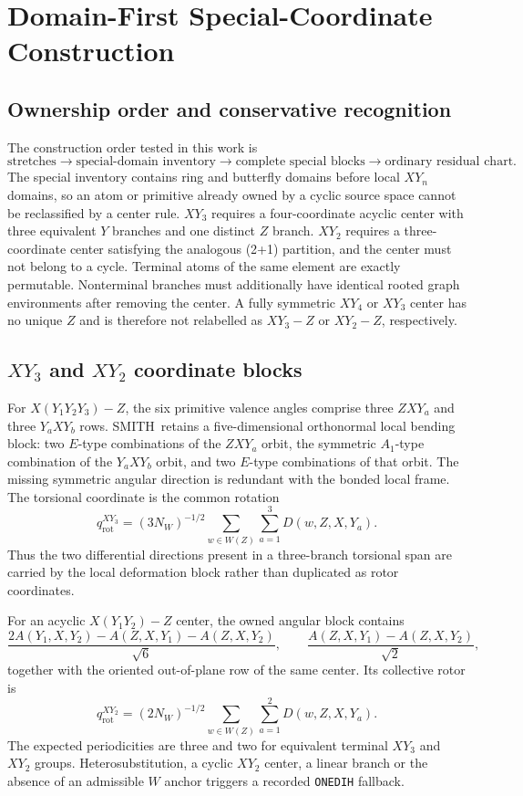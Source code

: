 \documentclass[10pt]{article}
\newcommand{\SMITH}{\textsc{SMITH}}
\begin{document}
{\color{red}
\section{Domain-First Special-Coordinate Construction}

\subsection{Ownership order and conservative recognition}

The construction order tested in this work is
\[
\text{stretches}\longrightarrow\text{special-domain inventory}
\longrightarrow\text{complete special blocks}
\longrightarrow\text{ordinary residual chart}.
\]
The special inventory contains ring and butterfly domains before local
\(XY_n\) domains, so an atom or primitive already owned by a cyclic source
space cannot be reclassified by a center rule.  \(XY_3\) requires a
four-coordinate acyclic center with three equivalent \(Y\) branches and one
distinct \(Z\) branch.  \(XY_2\) requires a three-coordinate center satisfying
the analogous (2+1) partition, and the center must not belong to a cycle.
Terminal atoms of the same element are exactly permutable.  Nonterminal
branches must additionally have identical rooted graph environments after
removing the center.  A fully symmetric \(XY_4\) or \(XY_3\) center has no
unique \(Z\) and is therefore not relabelled as \(XY_3-Z\) or \(XY_2-Z\),
respectively.

\subsection{\texorpdfstring{\(XY_3\) and \(XY_2\)}{XY3 and XY2} coordinate blocks}

For \(X(Y_1Y_2Y_3)-Z\), the six primitive valence angles comprise three
\(ZXY_a\) and three \(Y_aXY_b\) rows.  \SMITH\ retains a five-dimensional
orthonormal local bending block: two \(E\)-type combinations of the
\(ZXY_a\) orbit, the symmetric \(A_1\)-type combination of the
\(Y_aXY_b\) orbit, and two \(E\)-type combinations of that orbit.  The
missing symmetric angular direction is redundant with the bonded local frame.
The torsional coordinate is the common rotation
\[
q_{\mathrm{rot}}^{XY_3}=(3N_W)^{-1/2}
\sum_{w\in W(Z)}\sum_{a=1}^{3}D(w,Z,X,Y_a).
\]
Thus the two differential directions present in a three-branch torsional span
are carried by the local deformation block rather than duplicated as rotor
coordinates.

For an acyclic \(X(Y_1Y_2)-Z\) center, the owned angular block contains
\[
\frac{2A(Y_1,X,Y_2)-A(Z,X,Y_1)-A(Z,X,Y_2)}{\sqrt{6}},
\qquad
\frac{A(Z,X,Y_1)-A(Z,X,Y_2)}{\sqrt{2}},
\]
together with the oriented out-of-plane row of the same center.  Its collective
rotor is
\[
q_{\mathrm{rot}}^{XY_2}=(2N_W)^{-1/2}
\sum_{w\in W(Z)}\sum_{a=1}^{2}D(w,Z,X,Y_a).
\]
The expected periodicities are three and two for equivalent terminal
\(XY_3\) and \(XY_2\) groups.  Heterosubstitution, a cyclic \(XY_2\)
center, a linear branch or the absence of an admissible \(W\) anchor triggers
a recorded \texttt{ONEDIH} fallback.

}
\end{document}

